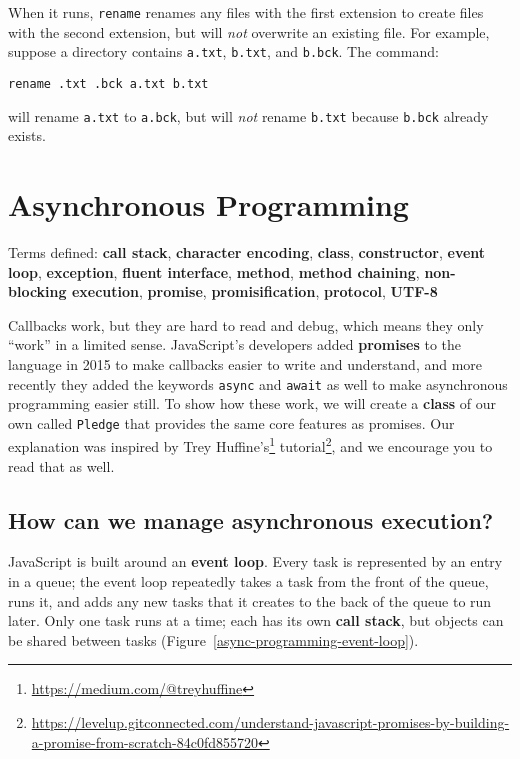 \documentclass[krantzl]{krantz}
\newcommand{\figref}[1]{Figure~\ref{#1}}
\newcommand{\glossref}[1]{\textbf{#1}}
\newcommand{\hreffoot}[2]{{#1}\footnote{\href{#2}{#2}}}
\begin{document}
When it runs,
\texttt{rename} renames any files with the first extension to create files with the second extension,
but will \emph{not} overwrite an existing file.
For example,
suppose a directory contains \texttt{a.txt}, \texttt{b.txt}, and \texttt{b.bck}.
The command:

\begin{lstlisting}[frame=tblr]
rename .txt .bck a.txt b.txt
\end{lstlisting}


\noindent will rename \texttt{a.txt} to \texttt{a.bck},
but will \emph{not} rename \texttt{b.txt} because \texttt{b.bck} already exists.

\chapter{Asynchronous Programming}\label{async-programming}


\noindent 
  Terms defined: \glossref{call stack}, \glossref{character encoding}, \glossref{class}, \glossref{constructor}, \glossref{event loop}, \glossref{exception}, \glossref{fluent interface}, \glossref{method}, \glossref{method chaining}, \glossref{non-blocking execution}, \glossref{promise}, \glossref{promisification}, \glossref{protocol}, \glossref{UTF-8}



Callbacks work,
but they are hard to read and debug,
which means they only “work” in a limited sense.
JavaScript’s developers added \glossref{promises} to the language in 2015
to make callbacks easier to write and understand,
and more recently they added the keywords \texttt{async} and \texttt{await} as well
to make asynchronous programming easier still.
To show how these work,
we will create a \glossref{class} of our own called \texttt{Pledge}
that provides the same core features as promises.
Our explanation was inspired by \hreffoot{Trey Huffine’s}{https://medium.com/@treyhuffine} \hreffoot{tutorial}{https://levelup.gitconnected.com/understand-javascript-promises-by-building-a-promise-from-scratch-84c0fd855720},
and we encourage you to read that as well.

\section{How can we manage asynchronous execution?}\label{async-programming-manage}


JavaScript is built around an \glossref{event loop}.
Every task is represented by an entry in a queue;
the event loop repeatedly takes a task from the front of the queue,
runs it,
and adds any new tasks that it creates to the back of the queue to run later.
Only one task runs at a time;
each has its own \glossref{call stack},
but objects can be shared between tasks
(\figref{async-programming-event-loop}).
\end{document}
